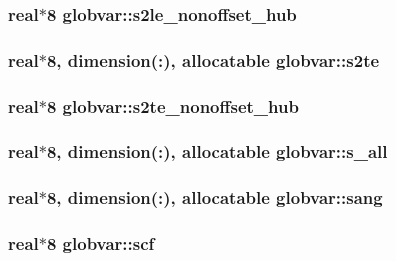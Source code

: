 \subsubsection[{s2le\+\_\+nonoffset\+\_\+hub}]{\setlength{\rightskip}{0pt plus 5cm}real$\ast$8 globvar\+::s2le\+\_\+nonoffset\+\_\+hub}\label{namespaceglobvar_a8eb69430dd19178f5b03bdb675e37743}
\hypertarget{namespaceglobvar_aecd5a79b6e1e9b517f57dcd7a03a513c}{}
\subsubsection[{s2te}]{\setlength{\rightskip}{0pt plus 5cm}real$\ast$8, dimension(\+:), allocatable globvar\+::s2te}\label{namespaceglobvar_aecd5a79b6e1e9b517f57dcd7a03a513c}
\hypertarget{namespaceglobvar_a339922829843baa5c9b7602f44111b2a}{}
\subsubsection[{s2te\+\_\+nonoffset\+\_\+hub}]{\setlength{\rightskip}{0pt plus 5cm}real$\ast$8 globvar\+::s2te\+\_\+nonoffset\+\_\+hub}\label{namespaceglobvar_a339922829843baa5c9b7602f44111b2a}
\hypertarget{namespaceglobvar_ad577edfa4a4ef2f6d3bb184a4e0931b1}{}
\subsubsection[{s\+\_\+all}]{\setlength{\rightskip}{0pt plus 5cm}real$\ast$8, dimension(\+:), allocatable globvar\+::s\+\_\+all}\label{namespaceglobvar_ad577edfa4a4ef2f6d3bb184a4e0931b1}
\hypertarget{namespaceglobvar_a3f70e26ad6e5208ef5da2f77d96a7e55}{}
\subsubsection[{sang}]{\setlength{\rightskip}{0pt plus 5cm}real$\ast$8, dimension(\+:), allocatable globvar\+::sang}\label{namespaceglobvar_a3f70e26ad6e5208ef5da2f77d96a7e55}
\hypertarget{namespaceglobvar_a7089ef5d62767168aa5fe9700d53846e}{}
\subsubsection[{scf}]{\setlength{\rightskip}{0pt plus 5cm}real$\ast$8 globvar\+::scf}\label{namespaceglobvar_a7089ef5d62767168aa5fe9700d53846e}
\hypertarget{namespaceglobvar_a208ad9b136524be1d4393b67f071b5eb}{}
